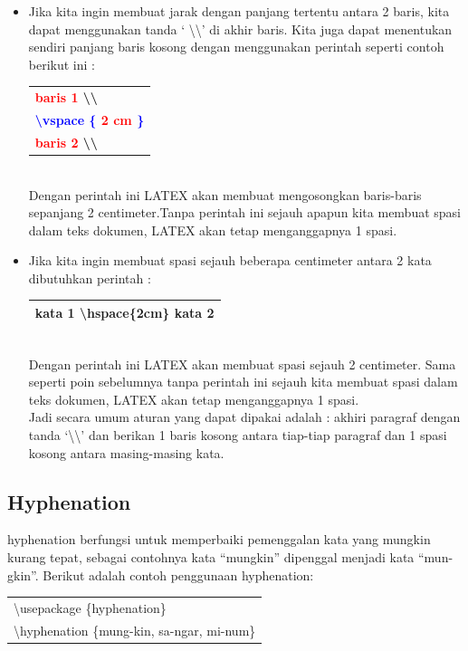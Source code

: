 \begin{itemize}
\item Jika kita ingin membuat jarak dengan panjang tertentu antara 2 baris, kita dapat menggunakan tanda ‘ \textbackslash \textbackslash’ di akhir baris. Kita juga dapat menentukan sendiri panjang baris kosong dengan menggunakan perintah seperti contoh berikut ini : 
\begin{table}[h!]
\begin{tabular}{|p{13.5 cm}|}
\hline
\bfseries{\textcolor{red}{baris 1}} \textbackslash  \textbackslash  \\
\bfseries{\textcolor{blue}{\textbackslash vspace \{ }} \bfseries{\textcolor{red}{2 cm}} \textcolor{blue}{ \} } \\
\bfseries{\textcolor{red}{baris 2}} \textbackslash  \textbackslash  \\
\hline
\end{tabular}
\end{table}
\\
Dengan perintah ini LATEX akan membuat mengosongkan baris-baris sepanjang 2 centimeter.Tanpa perintah ini sejauh apapun kita membuat spasi dalam teks dokumen, LATEX akan tetap menganggapnya 1 spasi.
\item Jika kita ingin membuat spasi sejauh beberapa centimeter antara 2 kata dibutuhkan
perintah : \\
\begin{table}[h!]
\begin{tabular}{|p{13.5 cm}|}
\hline
kata 1 \textbackslash hspace\{2cm\} kata 2\\
\hline
\end{tabular}
\end{table}
\\
Dengan perintah ini LATEX akan membuat spasi sejauh 2 centimeter. Sama seperti poin sebelumnya tanpa perintah ini sejauh kita membuat spasi dalam teks dokumen, LATEX akan tetap menganggapnya 1 spasi. \\[0.5 cm]

Jadi secara umum aturan yang dapat dipakai adalah : akhiri paragraf dengan tanda ‘\textbackslash \textbackslash’ dan berikan 1 baris kosong antara tiap-tiap paragraf dan 1 spasi kosong antara masing-masing kata.

\end{itemize}
\subsection{Hyphenation}
hyphenation berfungsi untuk memperbaiki pemenggalan kata yang mungkin kurang tepat, sebagai contohnya  kata “mungkin” dipenggal menjadi kata “mun-gkin”. Berikut adalah contoh penggunaan hyphenation: \\[0.5 cm]
\begin{tabular}{|p{13.5 cm}|}
\hline
\textbackslash usepackage \{hyphenation\} \\
          \textbackslash hyphenation \{mung-kin, sa-ngar, mi-num\}\\

\hline
\end{tabular}
